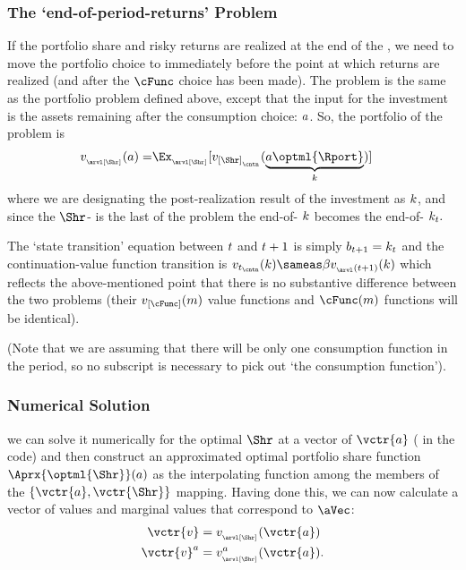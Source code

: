 \documentclass[SolvingMicroDSOPs]{subfiles}
\begin{document}
\subsubsection{The `end-of-period-returns' Problem}

If the portfolio share and risky returns are realized at the end of the {\interval}, we need to move the portfolio choice {\stg} to immediately before the point at which returns are realized (and after the $\cFunc$ choice has been made).  The problem is the same as the portfolio problem defined above, except that the input for the investment {\stg} is the assets remaining after the consumption choice: $a$.  So, the portfolio {\stg} of the problem is
\begin{equation}\begin{gathered}\begin{aligned}
  \vFunc_{_\arvl[\Shr]}(\aNrm) = & \Ex_{_\arvl[\Shr]}[\vFunc_{[\Shr]_{_\cntn}}(\underbrace{\aNrm\optml{\Rport}}_{\kNrm})] %
    \end{aligned}\end{gathered}\end{equation}
where we are designating the post-realization result of the investment as $k$, and since the $\Shr$-{\stg} is the last {\stg} of the problem the end-of-{\stg} $k$ becomes the end-of-{\interval} $k_{t}.$ 

The `state transition' equation between $t$ and $t+1$ is simply $b_{t+1} = k_{t}$ and the continuation-value function transition is $\vFunc_{\prd_\cntn}(\kNrm) \sameas \DiscFac \vFunc_{_\arvl(\prd+1)}(\kNrm)$ which reflects the above-mentioned point that there is no substantive difference between the two problems (their $\vFunc_{[\cFunc]}(\mNrm)$ value functions and $\cFunc(\mNrm)$ functions will be identical).

(Note that we are assuming that there will be only one consumption function in the period, so no {\stg} subscript is necessary to pick out `the consumption function'). 

\subsubsection{Numerical Solution}
we can solve it numerically for the optimal $\Shr$ at a vector of $\vctr{a}$ ({\aVecCode} in the code)  and then construct an approximated optimal portfolio share function $\Aprx{\optml{\Shr}}(a)$ as the interpolating function among the members of the $\{\vctr{a},\vctr{\Shr}\}$ mapping.  Having done this, we can now calculate a vector of values and marginal values that correspond to $\aVec$:
\begin{equation}\begin{gathered}\begin{aligned}
      \vctr{v}  & = \vFunc_{_\arvl[\Shr]}(\vctr{a}) \label{eq:vShrEnd}
\\      \vctr{v}^\aNrm  & = \vFunc^{\aNrm}_{_\arvl[\Shr]}(\vctr{a}).
    \end{aligned}\end{gathered}\end{equation}
\end{document}
